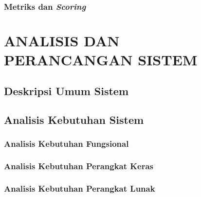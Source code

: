 \documentclass[ugmtesis]{ugmtesis}
\begin{document}
		\subsection{Metriks dan \textit{Scoring}}
		\label{metriks dan scoring}
		

	



\chapter{ANALISIS DAN PERANCANGAN SISTEM}
\label{ANALISIS DAN PERANCANGAN SISTEM}

	\section{Deskripsi Umum Sistem}
	\label{rancangan deskripsi umum sistem}
	

	\section{Analisis Kebutuhan Sistem}
	\label{rancangan analisis kebutuhan sistem}
	

		\subsection{Analisis Kebutuhan Fungsional}
		\label{rancangan kebutuhan fungsional}
		

		\subsection{Analisis Kebutuhan Perangkat Keras}
		\label{rancangan analisis kebutuhan perangkat keras}
		

		\subsection{Analisis Kebutuhan Perangkat Lunak}
		\label{rancangan analisis kebutuhan perangkat lunak}
		
\end{document}
